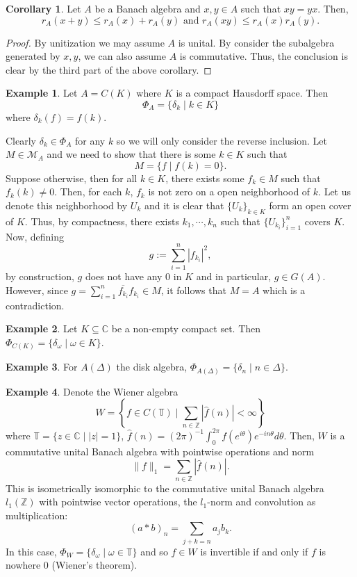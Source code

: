 \documentclass[]{article}
\theoremstyle{definition}
\newtheorem{corollary}{Corollary}[theorem]
\newtheorem{example}{Example}[section]
\begin{document}
\begin{corollary}\label{cor:commut_radius}
  Let \(A\) be a Banach algebra and \(x, y \in A\) such that \(xy = yx\). Then, 
  \[r_A(x + y) \le r_A(x) + r_A(y) \text{ and } r_A(xy) \le r_A(x) r_A(y).\]
\end{corollary}
\begin{proof}
  By unitization we may assume \(A\) is unital. By consider the subalgebra generated by \(x, y\), 
  we can also assume \(A\) is commutative. Thus, the conclusion is clear by the third part of the above corollary.
\end{proof}

\begin{example}
  Let \(A = C(K)\) where \(K\) is a compact Hausdorff space. Then 
  \[\Phi_A = \{\delta_k \mid k \in K\}\]
  where \(\delta_k(f) = f(k)\).

  Clearly \(\delta_k \in \Phi_A\) for any \(k\) so we will only consider the reverse inclusion.
  Let \(M \in \mathcal{M}_A\) and we need to show that there is some \(k \in K\) such that 
  \[M = \{f \mid f(k) = 0\}.\]
  Suppose otherwise, then for all \(k \in K\), there exists some \(f_k \in M\) such that 
  \(f_k(k) \ne 0\). Then, for each \(k\), \(f_k\) is not zero on a open neighborhood of \(k\). Let 
  us denote this neighborhood by \(U_k\) and it is clear that \(\{U_k\}_{k \in K}\) form an open 
  cover of \(K\). Thus, by compactness, there exists \(k_1, \cdots, k_n\) such that 
  \(\{U_{k_i}\}_{i = 1}^n\) covers \(K\). Now, defining 
  \[g := \sum_{i = 1}^n |f_{k_i}|^2,\]
  by construction, \(g\) does not have any 0 in \(K\) and in particular, \(g \in G(A)\). However, 
  since \(g = \sum_{i = 1}^n \overline{f_{k_i}} f_{k_i} \in M\), it follows that \(M = A\) which is 
  a contradiction.
\end{example}

\begin{example}
  Let \(K \subseteq \mathbb{C}\) be a non-empty compact set. Then \(\Phi_{C(K)} = \{\delta_\omega \mid \omega \in K\}\).
\end{example}

\begin{example}
  For \(A(\Delta)\) the disk algebra, \(\Phi_{A(\Delta)} = \{\delta_n \mid n \in \Delta\}\).
\end{example}

\begin{example}
  Denote the Wiener algebra 
  \[W = \left\{f \in C(\mathbb{T}) \mid \sum_{n \in \mathbb{Z}} |\hat{f}(n)| < \infty\right\}\]
  where \(\mathbb{T} = \{z \in \mathbb{C} \mid |z| = 1\}\), 
  \(\hat{f}(n) = (2\pi)^{-1}\int_0^{2\pi} f(e^{i\theta}) e^{-in\theta} d\theta\). Then, \(W\) is a commutative 
  unital Banach algebra with pointwise operations and norm 
  \[\|f\|_1 = \sum_{n \in \mathbb{Z}} |\hat{f}(n)|.\]
  This is isometrically isomorphic to the commutative unital Banach algebra \(l_1(\mathbb{Z})\) with 
  pointwise vector operations, the \(l_1\)-norm and convolution as multiplication: 
  \[(a * b)_n = \sum_{j + k = n} a_j b_k.\]
  In this case, \(\Phi_W  = \{\delta_\omega \mid \omega \in \mathbb{T}\}\) and so \(f \in W\) is 
  invertible if and only if \(f\) is nowhere 0 (Wiener's theorem). 
\end{example}
\end{document}
